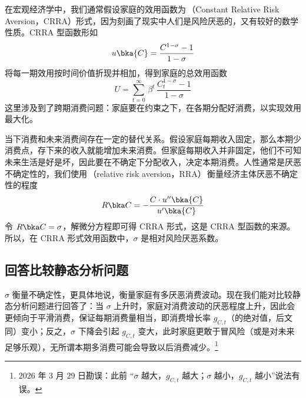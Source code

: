 在宏观经济学中，我们通常假设家庭的效用函数为\,（Constant Relative Risk Aversion，CRRA）形式，因为刻画了现实中人们是风险厌恶的，又有较好的数学性质。CRRA 型函数形如
\begin{equation*}
    u\bka{C}=\dfrac{C^{1-\sigma}-1}{1-\sigma}
\end{equation*}
将每一期效用按时间价值折现并相加，得到家庭的总效用函数
\begin{equation*}
    U=\sum_{t=0}^\infty \,\beta^t\,\dfrac{C_t^{1-\sigma}-1}{1-\sigma}
\end{equation*}
这里涉及到了跨期消费问题：家庭要在约束之下，在各期分配好消费，以实现效用最大化。

当下消费和未来消费间存在一定的替代关系。假设家庭每期收入固定，那么本期少消费点，存下来的收入就能增加未来消费。但家庭每期收入并非固定，他们不可知未来生活是好是坏，因此要在不确定下分配收入，决定本期消费。人性通常是厌恶不确定性的，我们使用\,（relative risk aversion，RRA）\,衡量经济主体厌恶不确定性的程度
\begin{equation*}
    R\bka C=-\dfrac{C\cdot u''\bka{C}}{u'\bka{C}}
\end{equation*}
令 \(R\bka C=\sigma\)，解微分方程即可得 CRRA 形式，这是 CRRA 型函数的来源。所以，在 CRRA 形式效用函数中，\(\sigma\) 是相对风险厌恶系数。

\subsection{回答比较静态分析问题}\label{subsec:ReplyCompStatic}

\(\sigma\) 衡量不确定性，更具体地说，衡量家庭有多厌恶消费波动。现在我们能对比较静态分析问题进行回答了：当 \(\sigma\) 上升时，家庭对消费波动的厌恶程度上升，因此会更倾向于平滑消费，保证每期消费量相当，即消费增长率 \(g_{C,t}\)（的绝对值，后文同）变小；反之，\(\sigma\) 下降会引起 \(g_{C,t}\) 变大，此时家庭更敢于冒风险（或是对未来足够乐观），无所谓本期多消费可能会导致以后消费减少。\footnote{2026 年 3 月 29 日勘误：此前 “\(\sigma\) 越大，\(g_{C,t}\) 越大；\(\sigma\) 越小，\(g_{C,t}\) 越小”说法有误。}

